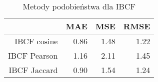 \begin{table}[ht]
\centering
\begin{tabular}{rrrr}
  \hline
 & MAE & MSE & RMSE \\ 
  \hline
IBCF cosine & 0.86 & 1.48 & 1.22 \\ 
  IBCF Pearson & 1.16 & 2.11 & 1.45 \\ 
  IBCF Jaccard & 0.90 & 1.54 & 1.24 \\ 
   \hline
\end{tabular}
\caption{Metody podobieństwa dla IBCF} 
\end{table}

